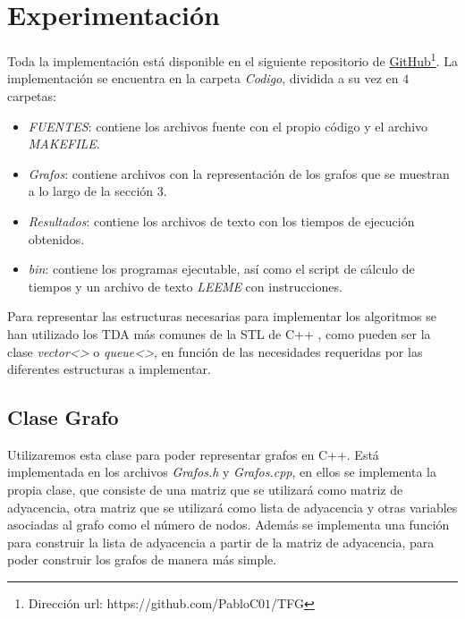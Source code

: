 
\chapter{Experimentación}\label{ch:quinto-capitulo}

Toda la implementación está disponible en el siguiente repositorio de \href{https://github.com/PabloC01/TFG}{GitHub}\footnote{Dirección url: https://github.com/PabloC$01$/TFG}. La implementación se encuentra en la carpeta \textit{Codigo}, dividida a su vez en $4$ carpetas:

\begin{itemize}
	\item \textit{FUENTES}: contiene los archivos fuente con el propio código y el archivo \textit{MAKEFILE}.
	\item \textit{Grafos}: contiene archivos con la representación de los grafos que se muestran a lo largo de la sección 3.
	\item \textit{Resultados}: contiene los archivos de texto con los tiempos de ejecución obtenidos.
	\item \textit{bin}: contiene los programas ejecutable, así como el script de cálculo de tiempos y un archivo de texto \textit{LEEME} con instrucciones.
\end{itemize}

Para representar las estructuras necesarias para implementar los algoritmos se han utilizado los TDA más comunes de la STL de C++ \cite{alma991014010751904990}, como pueden ser la clase \textit{vector<>} o \textit{queue<>}, en función de las necesidades requeridas por las diferentes estructuras a implementar.

\section{Clase Grafo}

Utilizaremos esta clase para poder representar grafos en C++. Está implementada en los archivos \textit{Grafos.h} y \textit{Grafos.cpp}, en ellos se implementa la propia clase, que consiste de una matriz que se utilizará como matriz de adyacencia, otra matriz que se utilizará como lista de adyacencia y otras variables asociadas al grafo como el número de nodos. Además se implementa una función para construir la lista de adyacencia a partir de la matriz de adyacencia, para poder construir los grafos de manera más simple. \\

